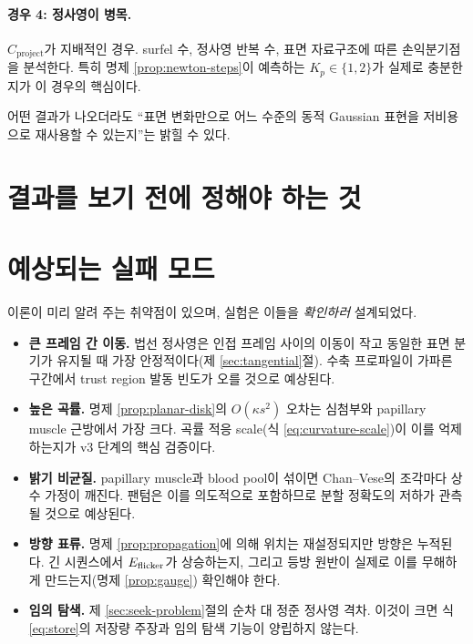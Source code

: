 \paragraph{경우 4: 정사영이 병목.}
$C_{\mathrm{project}}$가 지배적인 경우. surfel 수, 정사영 반복 수, 표면 자료구조에
따른 손익분기점을 분석한다. 특히 명제 \ref{prop:newton-steps}이 예측하는 $K_p\in\{1,2\}$가
실제로 충분한지가 이 경우의 핵심이다.

어떤 결과가 나오더라도 ``표면 변화만으로 어느 수준의 동적 Gaussian 표현을 저비용으로
재사용할 수 있는지''는 밝힐 수 있다.

\section{결과를 보기 전에 정해야 하는 것}


\section{예상되는 실패 모드}

이론이 미리 알려 주는 취약점이 있으며, 실험은 이들을 \emph{확인하러} 설계되었다.

\begin{itemize}[leftmargin=2em]
  \item \textbf{큰 프레임 간 이동.} 법선 정사영은 인접 프레임 사이의 이동이 작고 동일한
  표면 분기가 유지될 때 가장 안정적이다(제 \ref{sec:tangential}절). 수축 프로파일이
  가파른 구간에서 trust region 발동 빈도가 오를 것으로 예상된다.
  \item \textbf{높은 곡률.} 명제 \ref{prop:planar-disk}의 $O(\kappa s^2)$ 오차는 심첨부와
  papillary muscle 근방에서 가장 크다. 곡률 적응 scale(식 \eqref{eq:curvature-scale})이
  이를 억제하는지가 v3 단계의 핵심 검증이다.
  \item \textbf{밝기 비균질.} papillary muscle과 blood pool이 섞이면 Chan--Vese의
  조각마다 상수 가정이 깨진다. 팬텀은 이를 의도적으로 포함하므로 분할 정확도의 저하가
  관측될 것으로 예상된다.
  \item \textbf{방향 표류.} 명제 \ref{prop:propagation}에 의해 위치는 재설정되지만 방향은
  누적된다. 긴 시퀀스에서 $E_{\mathrm{flicker}}$가 상승하는지, 그리고 등방 원반이 실제로 이를
  무해하게 만드는지(명제 \ref{prop:gauge}) 확인해야 한다.
  \item \textbf{임의 탐색.} 제 \ref{sec:seek-problem}절의 순차 대 정준 정사영 격차.
  이것이 크면 식 \eqref{eq:store}의 저장량 주장과 임의 탐색 기능이 양립하지 않는다.
\end{itemize}

